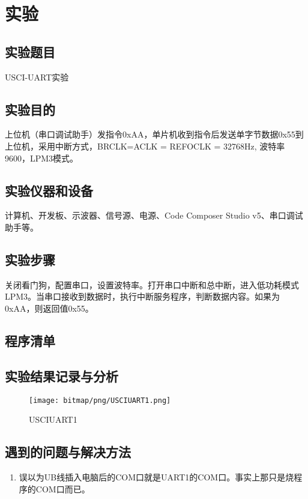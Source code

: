 ﻿%
\section{实验}
\subsection{实验题目}
USCI-UART实验
\subsection{实验目的}
上位机（串口调试助手）发指令0xAA，单片机收到指令后发送单字节数据0x55到上位机，采用中断方式，BRCLK=ACLK = REFOCLK = 32768Hz, 波特率9600，LPM3模式。
\subsection{实验仪器和设备}
计算机、开发板、示波器、信号源、电源、Code Composer Studio v5、串口调试助手等。
\subsection{实验步骤}
关闭看门狗，配置串口，设置波特率。打开串口中断和总中断，进入低功耗模式LPM3。当串口接收到数据时，执行中断服务程序，判断数据内容。如果为0xAA，则返回值0x55。
\subsection{程序清单}

\clearpage
\subsection{实验结果记录与分析}
\begin{figure}[htbp]
	\centering
	\caption{USCIUART1}
	\label{USCIUART1}
	\texttt{[image: bitmap/png/USCIUART1.png]}
\end{figure}
\subsection{遇到的问题与解决方法}
\begin{enumerate}
	\item 误以为UB线插入电脑后的COM口就是UART1的COM口。事实上那只是烧程序的COM口而已。
\end{enumerate}
